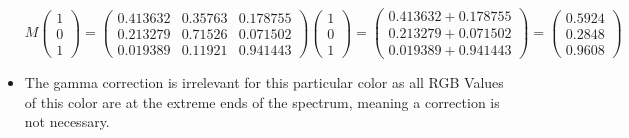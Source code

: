 \documentclass{article}
\begin{document}
\begin{itemize}
        $$M \left(\begin{matrix} 1 \\ 0 \\ 1\end{matrix}\right) = \left( \begin{matrix} 0.413632 & 0.35763 & 0.178755 \\ 0.213279 & 0.71526 & 0.071502 \\ 0.019389 & 0.11921 & 0.941443 \end{matrix} \right) \left(\begin{matrix} 1 \\ 0 \\ 1\end{matrix}\right) = \left(\begin{matrix} 0.413632 + 0.178755 \\ 0.213279 + 0.071502 \\ 0.019389 + 0.941443\end{matrix}\right) = \left(\begin{matrix} 0.5924 \\ 0.2848 \\ 0.9608\end{matrix}\right)$$
        
        \item The gamma correction is irrelevant for this particular color as all RGB Values of this color are at the extreme ends of the spectrum, meaning a correction is not necessary.
    \end{itemize}
    
    
    
    
\end{document}
